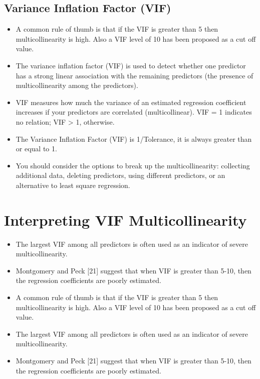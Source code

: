 \documentclass[a4paper,12pt]{article}
\begin{document}
\subsection{Variance Inflation Factor (VIF)}
\begin{itemize}

\item A common rule of thumb is that if the VIF is greater than 5 then multicollinearity is high. Also a VIF level of 10 has been proposed as a cut off value.

\item  The variance inflation factor (VIF) is used to detect whether one predictor has a strong linear association
with the remaining predictors (the presence of multicollinearity among the predictors).

\item  VIF measures how much the variance of an estimated regression coefficient increases if your predictors
are correlated (multicollinear). VIF = 1 indicates no relation; VIF > 1, otherwise.

\item  The Variance Inflation Factor (VIF) is 1/Tolerance, it is always greater than or equal to 1. 

\item  You should consider the options to break up the multicollinearity: collecting additional data, deleting predictors, using different predictors, or an alternative to least square regression.
\end{itemize}




\section{Interpreting VIF Multicollinearity}

\begin{itemize}

\item  The largest VIF among all predictors is often used as an indicator of severe multicollinearity.
\item  Montgomery and Peck [21] suggest that when VIF is greater than 5-10, then the regression coefficients are poorly estimated.
\item A common rule of thumb is that if the VIF is greater than 5 then multicollinearity is high.
Also a VIF level of 10 has been proposed as a cut off value.
\item The largest VIF among all predictors is often used as an indicator of severe multicollinearity. 
\item Montgomery and Peck [21] suggest that when VIF is greater than 5-10, then the regression coefficients are poorly estimated. 
\end{itemize}
\end{document}
